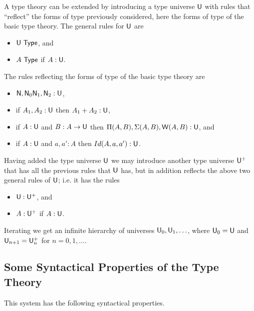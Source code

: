 \documentclass[10pt,a4paper]{article}
\newcommand{\Type}{{\sf Type}}
\newcommand{\UU}{{\sf U}}
\newcommand{\WW}{{\sf W}}
\newcommand{\NN}{{\sf N}}
\newcommand{\pacomment}[1]{}
\begin{document}
 A type theory can be extended by introducing a type universe $\UU$ with rules that ``reflect'' the forms of type previously considered, here the forms of type of the basic type theory.  The general rules for $\UU$ are

\begin{itemize}
\item $\UU~\Type$, and
\item $A~\Type$ if $A:\UU$.
\end{itemize}

The rules reflecting the forms of type of the basic type theory are

\begin{itemize}
\item $\NN,\NN_0\NN_1,\NN_2:\UU$,
\item if $A_1,A_2:\UU$ then $A_1+A_2:\UU$,
\item if $A:\UU$ and $B:A\rightarrow\UU$ then     $\Pi(A,B),\Sigma(A,B),\WW(A,B):\UU$, and 
\item if $A:\UU$ and $a,a':A$ then $Id(A,a,a'):\UU$.
\end{itemize}

Having added the type universe $\UU$ we may introduce another type universe
$\UU^+$ that has all the previous rules that $\UU$ has, but in addition reflects the above two general rules of $\UU$; i.e. it has the rules

\medskip

\begin{itemize}
\item $\UU:\UU^+$, and
\item $A:\UU^+$ if $A:\UU$.
\end{itemize}

\medskip

Iterating we get an infinite hierarchy of universes $\UU_0,\UU_1,\ldots$, where
$\UU_0=\UU$ and $\UU_{n+1}=\UU_n^+$ for $n=0,1,\ldots$.
\pacomment{%
\begin{itemize}
\item $\UU_n~\Type$
\item $A~\Type$ if $A:\UU_n$
\item $A:\UU_{n+1}$ if $A:\UU_n$
\item $\UU_n:\UU_{n+1}$
\end{itemize}
 }%

\medskip
\subsection*{Some Syntactical Properties of the Type Theory}
 This system has the following syntactical properties.
\end{document}
